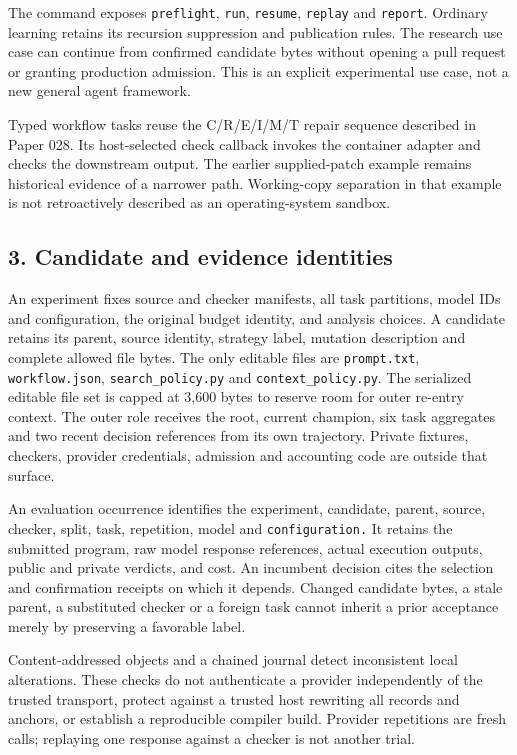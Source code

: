 \documentclass[
  11pt,
]{article}
\newcommand{\passthrough}[1]{#1}
\begin{document}
The command exposes \passthrough{\lstinline!preflight!},
\passthrough{\lstinline!run!}, \passthrough{\lstinline!resume!},
\passthrough{\lstinline!replay!} and \passthrough{\lstinline!report!}.
Ordinary learning retains its recursion suppression and publication
rules. The research use case can continue from confirmed candidate bytes
without opening a pull request or granting production admission. This is
an explicit experimental use case, not a new general agent framework.

Typed workflow tasks reuse the C/R/E/I/M/T repair sequence described in
Paper 028. Its host-selected check callback invokes the container
adapter and checks the downstream output. The earlier supplied-patch
example remains historical evidence of a narrower path. Working-copy
separation in that example is not retroactively described as an
operating-system sandbox.

\subsection{3. Candidate and evidence
identities}\label{candidate-and-evidence-identities}

An experiment fixes source and checker manifests, all task partitions,
model IDs and configuration, the original budget identity, and analysis
choices. A candidate retains its parent, source identity, strategy
label, mutation description and complete allowed file bytes. The only
editable files are \passthrough{\lstinline!prompt.txt!},
\nolinkurl{workflow.json}, \nolinkurl{search_policy.py} and
\nolinkurl{context_policy.py}. The serialized editable file set is
capped at 3,600 bytes to reserve room for outer re-entry context. The
outer role receives the root, current champion, six task aggregates and
two recent decision references from its own trajectory. Private
fixtures, checkers, provider credentials, admission and accounting code
are outside that surface.

An evaluation occurrence identifies the experiment, candidate, parent,
source, checker, split, task, repetition, model and
\nolinkurl{configuration.} It retains the submitted program, raw model
response references, actual execution outputs, public and private
verdicts, and cost. An incumbent decision cites the selection and
confirmation receipts on which it depends. Changed candidate bytes, a
stale parent, a substituted checker or a foreign task cannot inherit a
prior acceptance merely by preserving a favorable label.

Content-addressed objects and a chained journal detect inconsistent
local alterations. These checks do not authenticate a provider
independently of the trusted transport, protect against a trusted host
rewriting all records and anchors, or establish a reproducible compiler
build. Provider repetitions are fresh calls; replaying one response
against a checker is not another trial.
\end{document}
